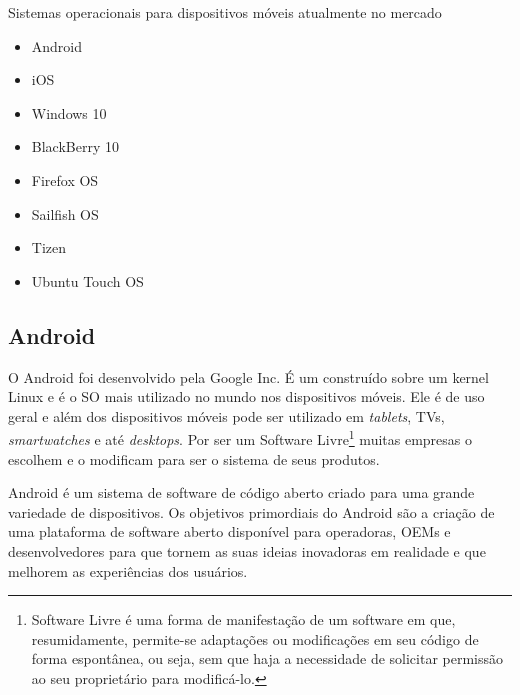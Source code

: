 \begin{small}
	\begin{description}
	    \item[Sistemas operacionais para dispositivos móveis atualmente no mercado]
	\end{description}\vspace{-6mm}
	\begin{itemize}
		\item Android
	  	\item iOS
		\item Windows 10
		\item BlackBerry 10
		\item Firefox OS
		\item Sailfish OS
		\item Tizen
		\item Ubuntu Touch OS
	\end{itemize}
\end{small}

\subsection{Android}
O Android foi desenvolvido pela Google Inc. É um  construído sobre um kernel Linux e é o SO mais utilizado no mundo nos dispositivos móveis. Ele é de uso geral e além dos dispositivos móveis pode ser utilizado em \textit{tablets}, TVs, \textit{smartwatches} e até \textit{desktops}. Por ser um Software Livre\footnote{Software Livre é uma forma de manifestação de um software em que, resumidamente, permite-se adaptações ou modificações em seu código de forma espontânea, ou seja, sem que haja a necessidade de solicitar permissão ao seu proprietário para modificá-lo.} muitas empresas o escolhem e o modificam para ser o sistema de seus produtos.
\begin{citacao}
Android é um sistema de software de código aberto criado para uma grande variedade de dispositivos. Os objetivos primordiais do Android são a criação de uma plataforma de software aberto disponível para operadoras, OEMs e desenvolvedores para que tornem as suas ideias inovadoras em realidade e que melhorem as experiências dos usuários. \cite{aboutandroid}
\end{citacao}

